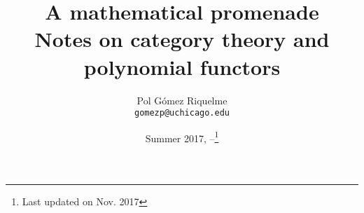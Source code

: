 \documentclass[12pt,oneside]{article}
\begin{document}
\title{
	A mathematical promenade\\\vspace{0.15in}
    \large{Notes on category theory and polynomial functors}
}
\author{Pol Gómez Riquelme \\ \texttt{gomezp@uchicago.edu}}
\date{Summer 2017, --\footnote{Last updated on Nov. 2017}}
\maketitle



\tableofcontents
\pagebreak






\pagebreak
\printbibliography
\end{document}
